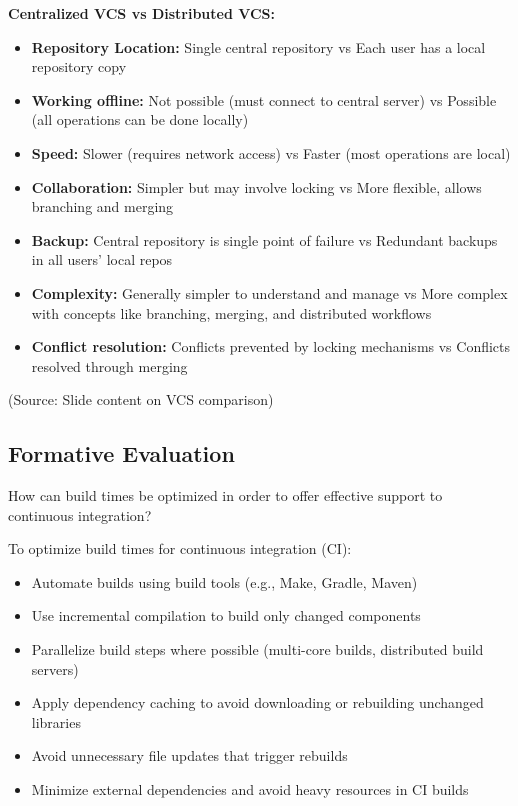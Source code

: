 \documentclass[12pt]{article}
\begin{document}
\textbf{Centralized VCS vs Distributed VCS:}
\begin{itemize}
    \item \textbf{Repository Location:} Single central repository vs Each user has a local repository copy
    \item \textbf{Working offline:} Not possible (must connect to central server) vs Possible (all operations can be done locally)
    \item \textbf{Speed:} Slower (requires network access) vs Faster (most operations are local)
    \item \textbf{Collaboration:} Simpler but may involve locking vs More flexible, allows branching and merging
    \item \textbf{Backup:} Central repository is single point of failure vs Redundant backups in all users' local repos
    \item \textbf{Complexity:} Generally simpler to understand and manage vs More complex with concepts like branching, merging, and distributed workflows
    \item \textbf{Conflict resolution:} Conflicts prevented by locking mechanisms vs Conflicts resolved through merging
\end{itemize}

(Source: Slide content on VCS comparison)

\subsection{Formative Evaluation}

\begin{questionbox}
How can build times be optimized in order to offer effective support to continuous integration?
\end{questionbox}

To optimize build times for continuous integration (CI):
\begin{itemize}
    \item Automate builds using build tools (e.g., Make, Gradle, Maven)
    \item Use incremental compilation to build only changed components
    \item Parallelize build steps where possible (multi-core builds, distributed build servers)
    \item Apply dependency caching to avoid downloading or rebuilding unchanged libraries
    \item Avoid unnecessary file updates that trigger rebuilds
    \item Minimize external dependencies and avoid heavy resources in CI builds
\end{itemize}
\end{document}
